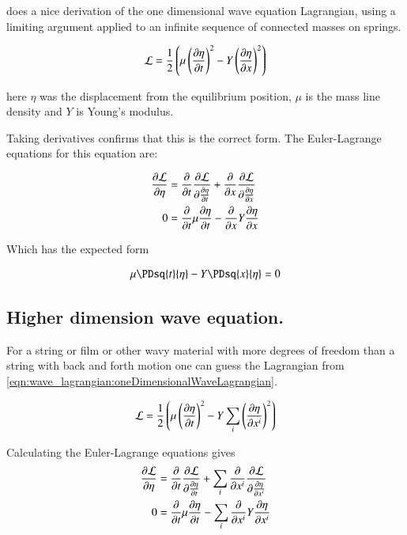 \cite{goldstein1951cm} does a nice derivation of the one dimensional wave
equation Lagrangian, using a limiting argument applied to an infinite
sequence of connected masses on springs.

\begin{align}\label{eqn:wave_lagrangian:oneDimensionalWaveLagrangian}
\mathcal{L} = \frac{1}{2} \left(\mu \left(\frac{\partial {\eta}}{\partial {t}}\right)^2 - Y \left(\frac{\partial {\eta}}{\partial {x}}\right)^2 \right)
\end{align}

here $\eta$ was the displacement from the equilibrium position, $\mu$ is the mass line density and $Y$ is Young's modulus.

Taking derivatives confirms that this is the correct form.  The Euler-Lagrange
equations for this equation are:

\begin{align*}
\frac{\partial {\mathcal{L}}}{\partial {\eta}} &= \frac{\partial {}}{\partial {t}} \frac{\partial {\mathcal{L}}}{\partial {\frac{\partial {\eta}}{\partial {t}}}} +\frac{\partial {}}{\partial {x}} \frac{\partial {\mathcal{L}}}{\partial {\frac{\partial {\eta}}{\partial {x}}}} \\
0 &= \frac{\partial {}}{\partial {t}} \mu \frac{\partial {\eta}}{\partial {t}} -\frac{\partial {}}{\partial {x}} Y \frac{\partial {\eta}}{\partial {x}} \\
\end{align*}

Which has the expected form

\begin{align*}
\mu \PDsq{t}{\eta} - Y \PDsq{x}{\eta} &= 0 \\
\end{align*}

\subsection{Higher dimension wave equation. }

For a string or film or other wavy material with more degrees of freedom than a string with back and forth motion one can guess the Lagrangian from \ref{eqn:wave_lagrangian:oneDimensionalWaveLagrangian}.

\begin{align}\label{eqn:wave_lagrangian:moreDimensionalWaveLagrangian}
\mathcal{L} = \frac{1}{2} \left(\mu \left(\frac{\partial {\eta}}{\partial {t}}\right)^2 - Y \sum_i \left(\frac{\partial {\eta}}{\partial {x^i}}\right)^2 \right)
\end{align}

Calculating the Euler-Lagrange equations gives
\begin{align*}
\frac{\partial {\mathcal{L}}}{\partial {\eta}} &= \frac{\partial {}}{\partial {t}} \frac{\partial {\mathcal{L}}}{\partial {\frac{\partial {\eta}}{\partial {t}}}} +\sum_i \frac{\partial {}}{\partial {x^i}} \frac{\partial {\mathcal{L}}}{\partial {\frac{\partial {\eta}}{\partial {x^i}}}} \\
0 &= \frac{\partial {}}{\partial {t}} \mu \frac{\partial {\eta}}{\partial {t}} - \sum_i \frac{\partial {}}{\partial {x^i}} Y \frac{\partial {\eta}}{\partial {x^i}} \\
\end{align*}

